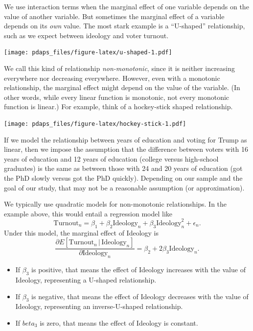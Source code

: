 \documentclass[
  12pt,
  oneside,openany]{book}
\begin{document}
We use interaction terms when the marginal effect of one variable depends on the value of another variable. But sometimes the marginal effect of a variable depends on its \emph{own} value. The most stark example is a ``U-shaped'' relationship, such as we expect between ideology and voter turnout.

\texttt{[image: pdaps\_files/figure-latex/u-shaped-1.pdf]}

We call this kind of relationship \emph{non-monotonic}, since it is neither increasing everywhere nor decreasing everywhere. However, even with a monotonic relationship, the marginal effect might depend on the value of the variable. (In other words, while every linear function is monotonic, not every monotonic function is linear.) For example, think of a hockey-stick shaped relationship.

\texttt{[image: pdaps\_files/figure-latex/hockey-stick-1.pdf]}

If we model the relationship between years of education and voting for Trump as linear, then we impose the assumption that the difference between voters with 16 years of education and 12 years of education (college versus high-school graduates) is the same as between those with 24 and 20 years of education (got the PhD slowly versus got the PhD quickly). Depending on our sample and the goal of our study, that may not be a reasonable assumption (or approximation).

We typically use quadratic models for non-monotonic relationships. In the example above, this would entail a regression model like
\[
\text{Turnout}_n = \beta_1 + \beta_2 \text{Ideology}_n + \beta_3 \text{Ideology}_n^2 + \epsilon_n.
\]
Under this model, the marginal effect of Ideology is
\[
\frac{\partial{}E[\text{Turnout}_n \,|\, \text{Ideology}_n]}{\partial{}\text{Ideology}_n}
= \beta_2 + 2 \beta_3 \text{Ideology}_n.
\]

\begin{itemize}
\item
  If \(\beta_3\) is positive, that means the effect of Ideology increases with the value of Ideology, representing a U-shaped relationship.
\item
  If \(\beta_3\) is negative, that means the effect of Ideology decreases with the value of Ideology, representing an inverse-U-shaped relationship.
\item
  If \(beta_3\) is zero, that means the effect of Ideology is constant.
\end{itemize}
\end{document}
